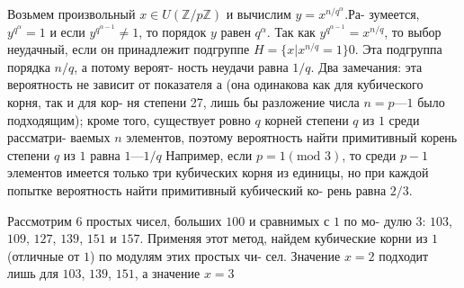 Возьмем произвольный $x \in U(\mathbb{Z}/p\mathbb{Z})$ и вычислим $y = x^{n/q^{\alpha}}$.Ра­-\linebreak
зумеется, $y^{q^{\alpha}} = 1$ и если $y^{q^{\alpha - 1}} \ne 1$, то порядок $y$ равен $q^{\alpha}$. Так как\linebreak
$y^{q^{\alpha -1}} = x^{n/q}$, то выбор неудачный, если он принадлежит подгруппе\linebreak
$H = \{x | x^{n/q} = 1\}0$. Эта подгруппа порядка $n/q$, а потому вероят-\linebreak
ность неудачи равна $1/q$. Два замечания: эта вероятность не зависит от\linebreak
показателя а (она одинакова как для кубического корня, так и для кор­-\linebreak
ня степени 27, лишь бы разложение числа $n = p — 1$ было подходящим);\linebreak
кроме того, существует ровно $q$ корней степени $q$ из $1$ среди рассматри­-\linebreak
ваемых $n$ элементов, поэтому вероятность найти примитивный корень\linebreak
степени $q$ из $1$ равна $1 — 1/q$ Например, если $p = 1 (\text{mod } 3)$, то среди\linebreak
$p-1$ элементов имеется только три кубических корня из единицы, но\linebreak
при каждой попытке вероятность найти примитивный кубический ко­-\linebreak
рень равна $2/3$.

Рассмотрим $6$ простых чисел, больших $100$ и сравнимых с $1$ по мо­-\linebreak
дулю $3$: $103$, $109$, $127$, $139$, $151$ и $157$. Применяя этот метод, найдем\linebreak
кубические корни из $1$ (отличные от $1$) по модулям этих простых чи­-\linebreak
сел. Значение $x = 2$ подходит лишь для $103$, $139$, $151$, а значение $x = 3$\linebreak

